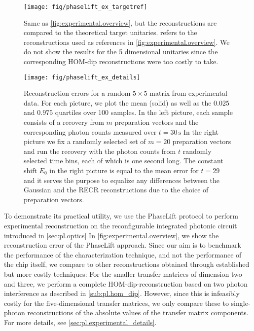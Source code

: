 \begin{figure*}[t]
  \centering
  \texttt{[image: fig/phaselift\_ex\_targetref]}
  \caption{%
     \label{fig:experimental.targetref}%
     Same as \cref{fig:experimental.overview}, but the reconstructions are compared to the theoretical target unitaries.
      refers to the reconstructions used as references in \cref{fig:experimental.overview}.
     We do not show the results for the 5 dimensional unitaries since the corresponding HOM-dip reconstructions were too costly to take.
  }
\end{figure*}
\begin{figure*}[t]
  \centering
  \texttt{[image: fig/phaselift\_ex\_details]}
  \caption{%
   \label{fig:pl.experimental.details}%
   Reconstruction errors for a random $5 \times 5$ matrix from experimental data.
   For each picture, we plot the mean (solid) as well as the $0.025$ and $0.975$ quartiles over 100 samples.
   In the left picture, each sample consists of a recovery from $m$ preparation vectors and the corresponding photon counts measured over $t = 30\,\mathrm{s}$
   In the right picture we fix a randomly selected set of $m=20$ preparation vectors and run the recovery with the photon counts from $t$ randomly selected time bins, each of which is one second long.
   The constant shift $E_0$ in the right picture is equal to the mean error for $t=29$ and it serves the purpose to equalize any differences between the Gaussian and the RECR reconstructions due to the choice of preparation vectors.
  }
\end{figure*}

To demonstrate its practical utility, we use the PhaseLift protocol to perform experimental reconstruction on the reconfigurable integrated photonic circuit introduced in \cref{sec:pl.optics}
In \cref{fig:experimental.overview}, we show the reconstruction error of the PhaseLift approach.
Since our aim is to benchmark the performance of the characterization technique, and not the performance of the chip itself, we compare to  other reconstructions obtained through established but more costly techniques:
For the smaller transfer matrices of dimension two and three, we perform a complete HOM-dip-reconstruction based on two photon interference as described in \cref{sub:pl.hom_dip}.
However, since this is infeasibly costly for the five-dimensional transfer matrices, we only compare these to single-photon reconstructions of the absolute values of the transfer matrix components.
For more details, see \cref{sec:pl.experimental_details}.

